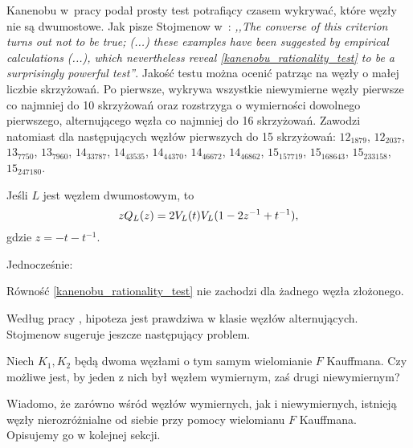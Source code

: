 Kanenobu w~pracy \cite{kanenobu89} podał prosty test potrafiący czasem wykrywać, które węzły nie są dwumostowe.
Jak pisze Stojmenow w~\cite{stoimenow00}: \emph{,,The converse of this criterion turns out not to be true; (...) these examples have been suggested by empirical calculations (...), which nevertheless reveal \ref{kanenobu_rationality_test} to be a surprisingly powerful test''}.
Jakość testu można ocenić patrząc na węzły o małej liczbie skrzyżowań.
Po pierwsze, wykrywa wszystkie niewymierne węzły pierwsze co najmniej do 10 skrzyżowań oraz rozstrzyga o wymierności dowolnego pierwszego, alternującego węzła co najmniej do 16 skrzyżowań.
Zawodzi natomiast dla następujących węzłów pierwszych do 15 skrzyżowań: $12_{1879}$, $12_{2037}$, $13_{7750}$, $13_{7960}$, $14_{33787}$, $14_{43535}$, $14_{44370}$, $14_{46672}$, $14_{46862}$, $15_{157719}$, $15_{168643}$, $15_{233158}$, $15_{247180}$.

\begin{proposition}
    \label{prop:blmho_twobridge}
    Jeśli $L$ jest węzłem dwumostowym, to
    \begin{equation}
        \label{kanenobu_rationality_test}
        z Q_L(z) = 2 V_L(t) V_L (1-2z^{-1}+t^{-1}),
    \end{equation}
    gdzie $z = -t - t^{-1}$.
\end{proposition}

Jednocześnie:

\begin{conjecture}
    Równość \ref{kanenobu_rationality_test} nie zachodzi dla żadnego węzła złożonego.
\end{conjecture}

Według pracy \cite{stoimenow00}, hipoteza jest prawdziwa w klasie węzłów alternujących.
Stojmenow sugeruje jeszcze następujący problem.

\begin{conjecture}
    Niech $K_1, K_2$ będą dwoma węzłami o tym samym wielomianie $F$ Kauffmana.
    Czy możliwe jest, by jeden z nich był węzłem wymiernym, zaś drugi niewymiernym?
\end{conjecture}

Wiadomo, że zarówno wśród węzłów wymiernych, jak i niewymiernych, istnieją węzły nierozróżnialne od siebie przy pomocy wielomianu $F$ Kauffmana.
Opisujemy go w kolejnej sekcji.

